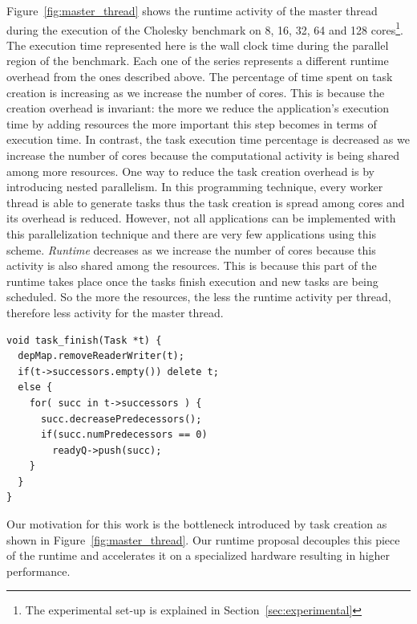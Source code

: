 Figure~\ref{fig:master_thread} shows the runtime activity of the master thread during the execution of the Cholesky benchmark on 8, 16, 32, 64 and 128 cores\footnote{The experimental set-up is explained in Section~\ref{sec:experimental}}.
The execution time represented here is the wall clock time during the parallel region of the benchmark.
Each one of the series represents a different runtime overhead from the ones described above.
The percentage of time spent on task creation is increasing as we increase the number of cores.
This is because the creation overhead is invariant: the more we reduce the application's execution time by adding resources the more important this step becomes in terms of execution time.
In contrast, the task execution time percentage is decreased as we increase the number of cores because the computational activity is being shared among more resources.
One way to reduce the task creation overhead is by introducing nested parallelism. 
In this programming technique, every worker thread is able to generate tasks thus the task creation is spread among cores and its overhead is reduced.
However, not all applications can be implemented with this parallelization technique and there are very few applications using this scheme.
\textit{Runtime} decreases as we increase the number of cores because this activity is also shared among the resources.
This is because this part of the runtime takes place once the tasks finish execution and new tasks are being scheduled. 
So the more the resources, the less the runtime activity per thread, therefore less activity for the master thread.

\begin{lstlisting}[float, emph={void,if,return,Task,for,not,true,and,break}, captionpos=b, caption={Pseudo-code for task$\_$finish runtime activity.},label=taskFinish, emph={[2]mat}, emphstyle={[5]}, aboveskip={0\baselineskip}, frame=tb, belowskip={0\baselineskip}]
void task_finish(Task *t) {
  depMap.removeReaderWriter(t);
  if(t->successors.empty()) delete t;
  else {
    for( succ in t->successors ) {
      succ.decreasePredecessors();
      if(succ.numPredecessors == 0) 
        readyQ->push(succ);
    }
  }
}
\end{lstlisting}

Our motivation for this work is the bottleneck introduced by task creation as shown in Figure~\ref{fig:master_thread}.
Our runtime proposal decouples this piece of the runtime and accelerates it on a specialized hardware resulting in higher performance.


